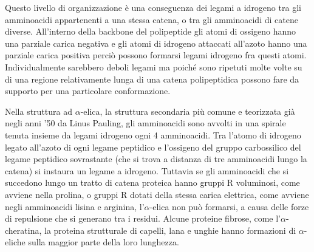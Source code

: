 {{Questo livello di organizzazione è una conseguenza dei legami a idrogeno tra gli amminoacidi appartenenti a una stessa catena, o tra gli amminoacidi di catene diverse.  All'interno della backbone del polipeptide gli atomi di ossigeno hanno una parziale carica negativa e gli atomi di idrogeno attaccati all'azoto hanno una parziale carica positiva perciò possono formarsi legami idrogeno fra questi atomi. Individualmente sarebbero deboli legami ma poiché sono ripetuti molte volte su di una regione relativamente lunga di una catena polipeptidica possono fare da supporto per una particolare conformazione.

\par Nella struttura ad $\alpha$-elica, la struttura secondaria più comune e teorizzata già negli anni '50 da Linus Pauling, gli amminoacidi sono avvolti in una spirale tenuta insieme da legami idrogeno ogni 4 amminoacidi. Tra l’atomo di idrogeno legato all’azoto di ogni legame peptidico e l’ossigeno del gruppo carbossilico del legame peptidico sovrastante (che si trova a distanza di tre amminoacidi lungo la catena) si instaura un legame a idrogeno. Tuttavia se gli amminoacidi che si succedono lungo un tratto di catena proteica hanno gruppi R voluminosi, come avviene nella prolina, o gruppi R dotati della stessa carica elettrica, come avviene negli amminoacidi lisina e arginina, l’$\alpha$-elica non può formarsi, a causa delle forze di repulsione che si generano tra i residui. Alcune proteine fibrose, come l'$\alpha$-cheratina, la proteina strutturale di capelli, lana e unghie hanno formazioni di $\alpha$-eliche sulla maggior parte della loro lunghezza.

}}
